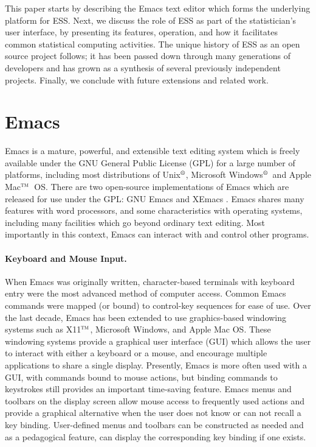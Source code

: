 \documentclass{article}
\newcommand*{\regstrd}{$^{\mbox{\scriptsize{\textregistered}}}$}
\newcommand*{\tm}{$^{\mbox{\scriptsize\sc tm}}$}
\begin{document}
This paper starts by describing the Emacs text editor which forms the
underlying platform for ESS.  Next, we discuss the role of ESS as part
of the statistician's user interface, by presenting its features,
operation, and how it facilitates common statistical computing
activities.  The unique history of ESS as an open source project
follows; it has been passed down through many generations of
developers and has grown as a synthesis of several previously
independent projects.  Finally, we conclude with future extensions and
related work.

\section{Emacs}
\label{sec:emacs}

Emacs is a mature, powerful, and extensible text editing system which
is freely available under the GNU General Public License (GPL) for a
large number of platforms, including most distributions of
Unix\regstrd, Microsoft Windows\regstrd\ and Apple Mac\tm\ OS.  There
are two open-source implementations of Emacs which are released for
use under the GPL: GNU Emacs \citep{GNU-Emacs} and XEmacs
\citep{XEmacs}.  Emacs shares many features with word processors, and
some characteristics with operating systems, including many facilities
which go beyond ordinary text editing.  Most importantly in this
context, Emacs can interact with and control other programs.

\paragraph{Keyboard and Mouse Input.}
When Emacs was originally written, character-based terminals with
keyboard entry were the most advanced method of computer access.
Common Emacs commands were mapped (or bound) to control-key sequences
for ease of use.  Over the last decade, Emacs has been extended to use
graphics-based windowing systems such as X11\tm, Microsoft Windows,
and Apple Mac OS.  These windowing systems provide a graphical user
interface (GUI) which allows the user to interact with either a
keyboard or a mouse, and encourage multiple applications to share a
single display.  Presently, Emacs is more often used with a GUI, with
commands bound to mouse actions, but binding commands to keystrokes
still provides an important time-saving feature.  Emacs menus and
toolbars on the display screen allow mouse access to frequently used
actions and provide a graphical alternative when the user does not
know or can not recall a key binding.  User-defined menus and toolbars
can be constructed as needed and as a pedagogical feature, can display
the corresponding key binding if one exists.
\end{document}
